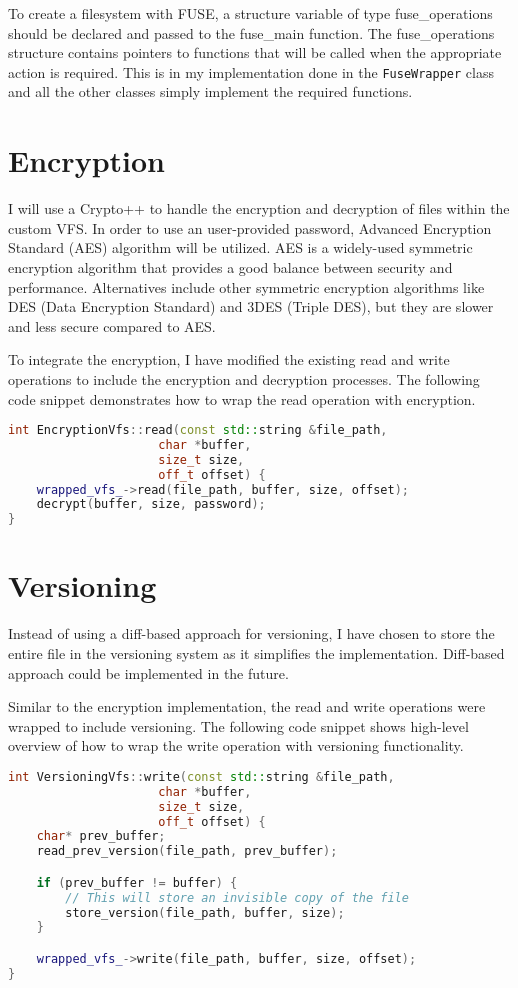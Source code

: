 To create a filesystem with FUSE, a structure variable of type fuse\_operations should be declared and passed to the fuse\_main function.
The fuse\_operations structure contains pointers to functions that will be called when the appropriate action is required.
This is in my implementation done in the \texttt{FuseWrapper} class and all the other classes simply implement the required functions.

\section{Encryption}\label{sec:encryption}

I will use a Crypto++ to handle the encryption and decryption of files within the custom VFS\@.
In order to use an user-provided password, Advanced Encryption Standard (AES) algorithm will be utilized.
AES is a widely-used symmetric encryption algorithm that provides a good balance between security and performance.
Alternatives include other symmetric encryption algorithms like DES (Data Encryption Standard) and 3DES (Triple DES), but they are slower and less secure compared to AES.

To integrate the encryption, I have modified the existing read and write operations to include the encryption and decryption processes.
The following code snippet demonstrates how to wrap the read operation with encryption.

\begin{lstlisting}[language=c++, basicstyle=\ttfamily\small]
int EncryptionVfs::read(const std::string &file_path,
                     char *buffer,
                     size_t size,
                     off_t offset) {
    wrapped_vfs_->read(file_path, buffer, size, offset);
    decrypt(buffer, size, password);
}
\end{lstlisting}

\section{Versioning}\label{sec:versioning2}

Instead of using a diff-based approach for versioning, I have chosen to store the entire file in the versioning system as it simplifies the implementation.
Diff-based approach could be implemented in the future.

Similar to the encryption implementation, the read and write operations were wrapped to include versioning.
The following code snippet shows high-level overview of how to wrap the write operation with versioning functionality.

\begin{lstlisting}[language=c++, basicstyle=\ttfamily\small]
int VersioningVfs::write(const std::string &file_path,
                     char *buffer,
                     size_t size,
                     off_t offset) {
    char* prev_buffer;
    read_prev_version(file_path, prev_buffer);

    if (prev_buffer != buffer) {
        // This will store an invisible copy of the file
        store_version(file_path, buffer, size);
    }

    wrapped_vfs_->write(file_path, buffer, size, offset);
}
\end{lstlisting}